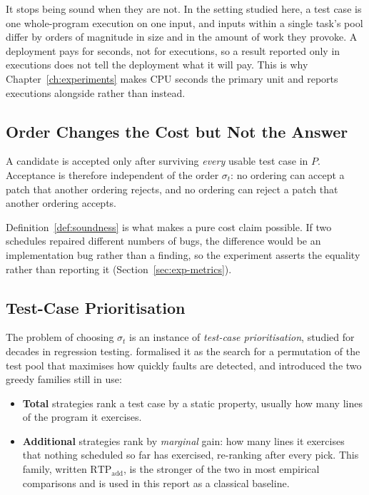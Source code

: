 It stops being sound when they are not. In the setting studied here, a test case
is one whole-program execution on one input, and inputs within a single task's
pool differ by orders of magnitude in size and in the amount of work they
provoke. A deployment pays for seconds, not for executions, so a result reported
only in executions does not tell the deployment what it will pay. This is why
Chapter~\ref{ch:experiments} makes CPU seconds the primary unit and reports
executions alongside rather than instead.

\subsection{Order Changes the Cost but Not the Answer}

\begin{definition}
\label{def:soundness}
A candidate is accepted only after surviving \emph{every} usable test case in
$P$. Acceptance is therefore independent of the order $\sigma_t$: no ordering
can accept a patch that another ordering rejects, and no ordering can reject a
patch that another ordering accepts.
\end{definition}

Definition~\ref{def:soundness} is what makes a pure cost claim possible. If two
schedules repaired different numbers of bugs, the difference would be an
implementation bug rather than a finding, so the experiment asserts the
equality rather than reporting it (Section~\ref{sec:exp-metrics}).

\subsection{Test-Case Prioritisation}

The problem of choosing $\sigma_t$ is an instance of \emph{test-case
prioritisation}, studied for decades in regression testing.
\citet{rothermel2001prioritizing} formalised it as the search for a permutation
of the test pool that maximises how quickly faults are detected, and introduced
the two greedy families still in use:

\begin{itemize}[leftmargin=*,itemsep=3pt]
\item \textbf{Total} strategies rank a test case by a static property, usually
how many lines of the program it exercises.
\item \textbf{Additional} strategies rank by \emph{marginal} gain: how many
lines it exercises that nothing scheduled so far has exercised, re-ranking after
every pick. This family, written $\mathrm{RTP_{add}}$, is the stronger of the
two in most empirical comparisons and is used in this report as a classical
baseline.
\end{itemize}

